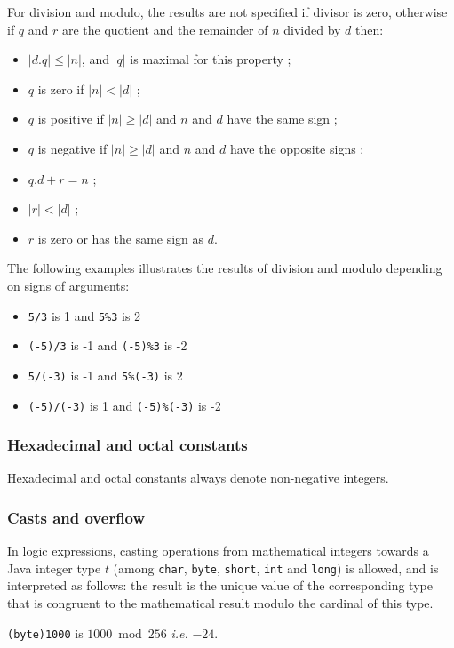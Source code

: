 \documentclass[a4paper,11pt,twoside,openright]{report}
\begin{document}
For division and modulo, the results are not specified if divisor is
zero, otherwise if $q$ and $r$ are the quotient and the remainder of
$n$ divided by $d$ then:
\begin{itemize}
\item $|d.q| \leq |n|$, and $|q|$ is maximal for this property ;
\item $q$ is zero if $|n|<|d|$ ;
\item $q$ is positive if $|n|\geq|d|$ and $n$ and $d$ have the same sign ;
\item $q$ is negative if $|n|\geq|d|$ and $n$ and $d$ have the opposite signs ;
\item $q.d+r = n$ ;
\item $|r|<|d|$ ;
\item $r$ is zero or has the same sign as $d$.
\end{itemize}

\begin{example}
  The following examples illustrates the results of division and modulo depending on signs of arguments:
  \begin{itemize}
  \item \verb|5/3| is 1 and \verb|5%3| is 2
  \item \verb|(-5)/3| is -1 and \verb|(-5)%3| is -2
  \item \verb|5/(-3)| is -1 and \verb|5%(-3)| is 2
  \item \verb|(-5)/(-3)| is 1 and \verb|(-5)%(-3)| is -2
  \end{itemize}
\end{example}

\subsubsection{Hexadecimal and octal constants}

Hexadecimal and octal constants always denote non-negative integers.

\subsubsection{Casts and overflow}

In logic expressions, casting operations from mathematical integers
towards a Java integer type $t$ (among \texttt{char}, \texttt{byte},
\texttt{short}, \texttt{int} and \texttt{long}) is
allowed, and is interpreted as follows: the result is the unique value
of the corresponding type that is congruent to the mathematical result
modulo the cardinal of this type.
\begin{example}
  \texttt{(byte)1000} is $1000 \bmod 256$ \emph{i.e.} $-24$.
\end{example}
\end{document}
